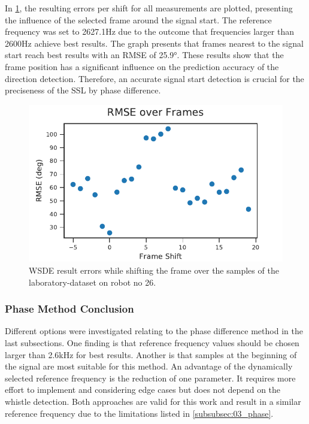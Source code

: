 In \cref{fig:04_phaseOverTime}, the resulting errors per shift
for all measurements are plotted, presenting the influence of the
selected frame around the signal start.
The reference frequency was set to 2627.1\si{\hertz} due to the
outcome that frequencies larger than 2600\si{\hertz} achieve best results.
The graph presents that frames nearest to the signal start reach best results
with an \ac{RMSE} of 25.9\si{\degree}.
These results show that the frame position has a significant influence on the prediction
accuracy of the direction detection.
Therefore, an accurate signal start detection is crucial for the preciseness of the \ac{SSL}
by phase difference.
\begin{figure}[ht]
	\centering
		\includegraphics[]{figures/evaluation/phase_over_time}
	\caption{\ac{WSDE} result errors while shifting the frame over the
	samples of the laboratory-dataset on robot no 26.}
	\label{fig:04_phaseOverTime}
\end{figure}

\subsubsection*{Phase Method Conclusion}
\label{subsubsec:04_phaseMethodConclusion}

Different options were investigated relating to the phase difference method
in the last subsections.
One finding is that reference frequency values should be chosen larger than
2.6\si{\kilo\hertz} for best results.
Another is that samples at the beginning of the signal are most suitable
for this method.
An advantage of the dynamically selected reference frequency is the reduction of
one parameter.
It requires more effort to implement and considering edge cases but
does not depend on the whistle detection.
Both approaches are valid for this work and result in a similar reference
frequency due to the limitations listed in \cref{subsubsec:03_phase}.


